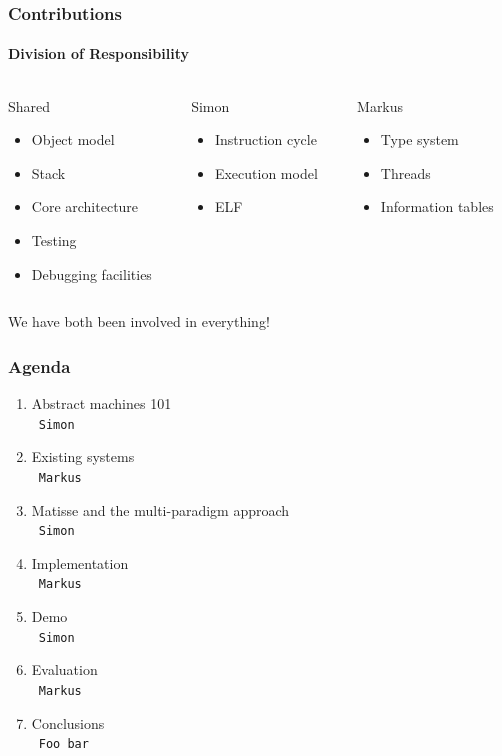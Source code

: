 \documentclass{beamer}
\newcommand{\n}[1]{\leavevmode\\~\texttt{\color{red}\tiny #1}}
\begin{document}
\begin{frame}
  \frametitle{Contributions}
  \framesubtitle{Division of Responsibility}

  \begin{columns}[onlytextwidth, t]
    \begin{column}{0.33\textwidth}
      Shared
      \fontsize{9pt}{15}\selectfont
      \begin{itemize}
      \item Object model
      \item Stack
      \item Core architecture
      \item Testing
      \item Debugging facilities
      \end{itemize}
    \end{column}

    \pause{}

    \begin{column}{0.33\textwidth}
      Simon
      \fontsize{9pt}{15}\selectfont
      \begin{itemize}
      \item Instruction cycle
      \item Execution model
      \item ELF
      \end{itemize}
    \end{column}

    \pause{}

    \begin{column}{0.33\textwidth}
      Markus
      \fontsize{9pt}{15}\selectfont
      \begin{itemize}
      \item Type system
      \item Threads
      \item Information tables
      \end{itemize}
    \end{column}
  \end{columns}

  \pause{}

  \vspace{30pt}
  \centering
  We have both been involved in everything!

\end{frame}

\begin{frame}
  \frametitle{Agenda}
  \fontsize{11pt}{20}\selectfont
  \begin{enumerate}[<+->]
  \item Abstract machines 101
    \n{Simon}
  \item Existing systems
    \n{Markus}
  \item Matisse and the multi-paradigm approach
    \n{Simon}
  \item Implementation
    \n{Markus}
  \item Demo
    \n{Simon}
  \item Evaluation
    \n{Markus}
  \item Conclusions
    \n{Foo bar}
  \end{enumerate}
\end{frame}
\end{document}
